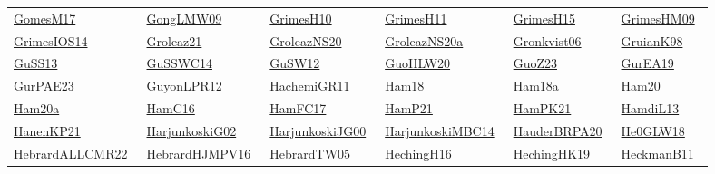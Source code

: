 \begin{longtable}{*{6}{l}}
\href{../works/GomesM17.pdf}{GomesM17}~\cite{GomesM17} & \href{../}{GongLMW09}~\cite{GongLMW09} & \href{../works/GrimesH10.pdf}{GrimesH10}~\cite{GrimesH10} & \href{../works/GrimesH11.pdf}{GrimesH11}~\cite{GrimesH11} & \href{../works/GrimesH15.pdf}{GrimesH15}~\cite{GrimesH15} & \href{../works/GrimesHM09.pdf}{GrimesHM09}~\cite{GrimesHM09}\\ 
\href{../works/GrimesIOS14.pdf}{GrimesIOS14}~\cite{GrimesIOS14} & \href{../works/Groleaz21.pdf}{Groleaz21}~\cite{Groleaz21} & \href{../works/GroleazNS20.pdf}{GroleazNS20}~\cite{GroleazNS20} & \href{../works/GroleazNS20a.pdf}{GroleazNS20a}~\cite{GroleazNS20a} & \href{../}{Gronkvist06}~\cite{Gronkvist06} & \href{../works/GruianK98.pdf}{GruianK98}~\cite{GruianK98}\\ 
\href{../works/GuSS13.pdf}{GuSS13}~\cite{GuSS13} & \href{../}{GuSSWC14}~\cite{GuSSWC14} & \href{../works/GuSW12.pdf}{GuSW12}~\cite{GuSW12} & \href{../}{GuoHLW20}~\cite{GuoHLW20} & \href{../works/GuoZ23.pdf}{GuoZ23}~\cite{GuoZ23} & \href{../works/GurEA19.pdf}{GurEA19}~\cite{GurEA19}\\ 
\href{../works/GurPAE23.pdf}{GurPAE23}~\cite{GurPAE23} & \href{../works/GuyonLPR12.pdf}{GuyonLPR12}~\cite{GuyonLPR12} & \href{../works/HachemiGR11.pdf}{HachemiGR11}~\cite{HachemiGR11} & \href{../works/Ham18.pdf}{Ham18}~\cite{Ham18} & \href{../works/Ham18a.pdf}{Ham18a}~\cite{Ham18a} & \href{../}{Ham20}~\cite{Ham20}\\ 
\href{../}{Ham20a}~\cite{Ham20a} & \href{../works/HamC16.pdf}{HamC16}~\cite{HamC16} & \href{../}{HamFC17}~\cite{HamFC17} & \href{../}{HamP21}~\cite{HamP21} & \href{../works/HamPK21.pdf}{HamPK21}~\cite{HamPK21} & \href{../}{HamdiL13}~\cite{HamdiL13}\\ 
\href{../works/HanenKP21.pdf}{HanenKP21}~\cite{HanenKP21} & \href{../works/HarjunkoskiG02.pdf}{HarjunkoskiG02}~\cite{HarjunkoskiG02} & \href{../}{HarjunkoskiJG00}~\cite{HarjunkoskiJG00} & \href{../works/HarjunkoskiMBC14.pdf}{HarjunkoskiMBC14}~\cite{HarjunkoskiMBC14} & \href{../works/HauderBRPA20.pdf}{HauderBRPA20}~\cite{HauderBRPA20} & \href{../works/He0GLW18.pdf}{He0GLW18}~\cite{He0GLW18}\\ 
\href{../works/HebrardALLCMR22.pdf}{HebrardALLCMR22}~\cite{HebrardALLCMR22} & \href{../works/HebrardHJMPV16.pdf}{HebrardHJMPV16}~\cite{HebrardHJMPV16} & \href{../works/HebrardTW05.pdf}{HebrardTW05}~\cite{HebrardTW05} & \href{../works/HechingH16.pdf}{HechingH16}~\cite{HechingH16} & \href{../}{HechingHK19}~\cite{HechingHK19} & \href{../works/HeckmanB11.pdf}{HeckmanB11}~\cite{HeckmanB11}\\ 

\end{longtable}
